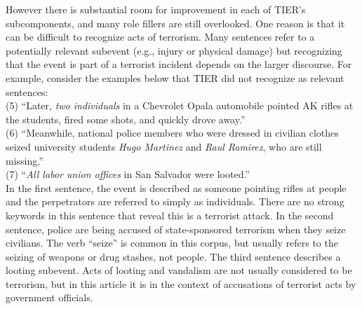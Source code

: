
However there is substantial room for improvement in each of TIER's
subcomponents, and many role fillers are still overlooked. One reason
is that  it can be difficult to recognize acts of terrorism.  Many sentences refer
to a potentially relevant subevent (e.g., injury or physical damage) but
recognizing that the event is part of a terrorist incident depends on the
larger discourse. For example, consider the examples below that TIER
did not recognize as relevant sentences:  \\


\noindent
(5) ``Later, {\em two individuals} in a Chevrolet Opala automobile pointed AK
rifles at the students, fired some shots, and quickly drove away.''\\ 


\noindent
(6) ``Meanwhile, national police members who were dressed in civilian
clothes seized university students {\em Hugo Martinez} and {\em Raul
  Ramirez}, who are still missing.'' \\

\noindent
(7) ``{\it All labor union offices} in San Salvador were looted.'' \\


In the first sentence, the event is described as someone pointing rifles at
people and the perpetrators are referred to simply as
individuals. There are no strong keywords in this sentence that reveal
this is a terrorist attack.  In the second sentence, police are
being accused of state-sponsored terrorism when they seize
civilians. The verb ``seize'' is common in this corpus, but usually
refers to the seizing of weapons or drug stashes, not people. The third
sentence describes a looting subevent. Acts of looting and vandalism are
not usually considered to be terrorism, but in this article it is
in the context of accusations of terrorist acts by government officials.


